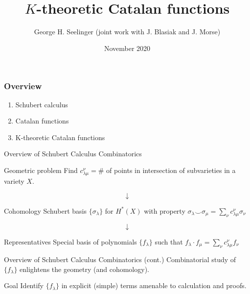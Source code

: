 \documentclass{beamer}
\title[\(K\)-theoretic Catalan functions]{\(K\)-theoretic Catalan functions} %
\author[George H. Seelinger]{George H. Seelinger (joint work with
  J. Blasiak and J. Morse)} %
\institute[UVA] %
{
Junior Mathematician Research Archive\\ %
\medskip
ghs9ae@virginia.edu\\ %
\medskip
Based on arXiv:2010.01759
}
\date{November 2020} %
\newcommand{\cupprod}{\smile}
\theoremstyle{definition}
\begin{document}
\begin{frame}
\titlepage %
\end{frame}
\begin{frame}
  \frametitle{Overview}
  \begin{enumerate}
  \item Schubert calculus
  \item Catalan functions
  \item K-theoretic Catalan functions
  \end{enumerate}
\end{frame}
\begin{frame}{Overview of Schubert Calculus Combinatorics}
  \begin{block}{Geometric problem}
    Find \(c_{\lambda \mu}^\nu = \#\) of points in
    intersection of subvarieties in a variety \(X\). \pause
  \end{block}
  \[
    \downarrow
  \]
  \begin{block}{Cohomology}
    Schubert basis \(\{\sigma_\lambda\}\) for \(H^*(X)\) with property
    \(\sigma_\lambda \cupprod \sigma_\mu = \sum_\nu c_{\lambda \mu}^\nu \sigma_\nu\) \pause 
\end{block}
\[
  \downarrow
\]
\begin{block}{Representatives}
  Special basis of polynomials \(\{f_\lambda\}\) such that \(f_\lambda \cdot f_\mu = \sum_\nu c_{\lambda \mu}^\nu f_\nu\)
\end{block}
\end{frame}
\begin{frame}{Overview of Schubert Calculus Combinatorics (cont.)}
  Combinatorial study of \(\{f_\lambda\}\) enlightens the geometry
  (and cohomology). \pause
  \begin{alertblock}{Goal}
    Identify \(\{f_\lambda\}\) in explicit (simple) terms amenable to
    calculation and proofs.
  \end{alertblock}
\end{frame}
\end{document}
